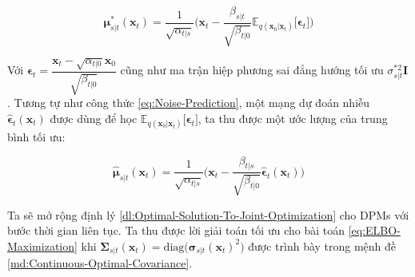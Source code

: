 \documentclass[14pt, a4paper]{article}
\numberwithin{equation}{section}
\numberwithin{figure}{section}
\numberwithin{dl}{section}
\numberwithin{md}{section}
\numberwithin{bd}{section}
\numberwithin{dn}{section}
\numberwithin{hq}{section}
\begin{document}
    \begin{equation} \label{eq:Continuous-Optimal-Mean}
        \boldsymbol{\mu}_{s \vert t}^{\ast} (\boldsymbol{x}_t) = \dfrac{1}{\sqrt{\alpha_{t \vert s}}}\Big( \boldsymbol{x}_t - \dfrac{\beta_{s \vert t}}{\sqrt{\beta_{t \vert 0}}} \mathbb{E}_{q(\boldsymbol{x}_0 \vert \boldsymbol{x}_t)} \lbrack \boldsymbol{\epsilon}_t \rbrack \Big)
    \end{equation}

    Với $\boldsymbol{\epsilon}_t = \dfrac{\boldsymbol{x}_t - \sqrt{\alpha_{t \vert 0}} \boldsymbol{x}_0}{\sqrt{\beta_{t \vert 0}}}$ cũng như ma trận hiệp phương sai đẳng hướng tối ưu $\sigma_{s \vert t}^{\ast 2} \boldsymbol{I}$.
    Tương tự như công thức \ref{eq:Noise-Prediction}, một mạng dự đoán nhiễu $\hat{\boldsymbol{\epsilon}}_t (\boldsymbol{x}_t)$ được dùng để học $\mathbb{E}_{q(\boldsymbol{x}_0 \vert \boldsymbol{x}_t)}  \lbrack \boldsymbol{\epsilon}_t \rbrack$,
    ta thu được một ước lượng của trung bình tối ưu:

    \begin{equation} \label{eq:Estimated-Continuous-Optimal-Mean}
        \hat{\boldsymbol{\mu}}_{s \vert t} (\boldsymbol{x}_t) = \dfrac{1}{\sqrt{\alpha_{t \vert s}}} \Big( \boldsymbol{x}_t - \dfrac{\beta_{t \vert s}}{\sqrt{\beta_{t \vert 0}}} \hat{\boldsymbol{\epsilon}}_t (\boldsymbol{x}_t) \Big)
    \end{equation}

    Ta sẽ mở rộng định lý \ref{dl:Optimal-Solution-To-Joint-Optimization} cho DPMs với bước thời gian liên tục.
    Ta thu được lời giải toán tối ưu cho bài toán \ref{eq:ELBO-Maximization} khi $\boldsymbol{\Sigma}_{s \vert t} (\boldsymbol{x}_t)=\mathrm{diag}\big(\boldsymbol{\sigma}_{s \vert t} (\boldsymbol{x}_t)^2 \big)$ được trình bày trong mệnh đề \ref{md:Continuous-Optimal-Covariance}.
\end{document}
